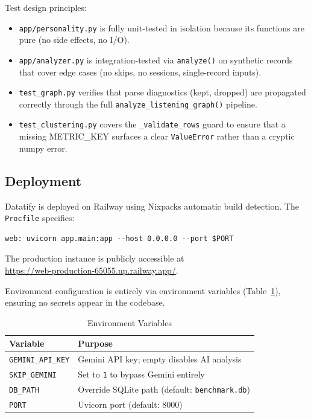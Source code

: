 \documentclass[conference]{IEEEtran}
\begin{document}
Test design principles:
\begin{itemize}
  \item \texttt{app/personality.py} is fully unit-tested in isolation because
        its functions are pure (no side effects, no I/O).
  \item \texttt{app/analyzer.py} is integration-tested via
        \texttt{analyze()} on synthetic records that cover edge cases
        (no skips, no sessions, single-record inputs).
  \item \texttt{test\_graph.py} verifies that parse diagnostics (kept,
        dropped) are propagated correctly through the full
        \texttt{analyze\_listening\_graph()} pipeline.
  \item \texttt{test\_clustering.py} covers the \texttt{\_validate\_rows}
        guard to ensure that a missing METRIC\_KEY surfaces a clear
        \texttt{ValueError} rather than a cryptic numpy error.
\end{itemize}

\subsection{Deployment}

Datatify is deployed on Railway using Nixpacks automatic build detection.
The \texttt{Procfile} specifies:
\begin{verbatim}
web: uvicorn app.main:app --host 0.0.0.0 --port $PORT
\end{verbatim}
The production instance is publicly accessible at\\
\url{https://web-production-65055.up.railway.app/}.

Environment configuration is entirely via environment variables
(Table~\ref{tab:env}), ensuring no secrets appear in the codebase.

\begin{table}[ht]
\caption{Environment Variables}
\label{tab:env}
\centering
\begin{tabular}{lp{3.6cm}}
\toprule
\textbf{Variable} & \textbf{Purpose} \\
\midrule
\texttt{GEMINI\_API\_KEY} & Gemini API key; empty disables AI analysis \\
\texttt{SKIP\_GEMINI}     & Set to \texttt{1} to bypass Gemini entirely \\
\texttt{DB\_PATH}         & Override SQLite path (default: \texttt{benchmark.db}) \\
\texttt{PORT}             & Uvicorn port (default: 8000) \\
\bottomrule
\end{tabular}
\end{table}
\end{document}
